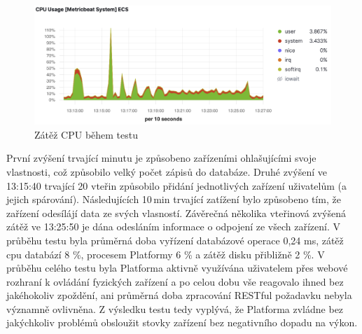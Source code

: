 \begin{figure}[htbp]
    \centering
    \includegraphics[width=\textwidth]{img/cpu_usage.png}
    \caption{\label{cpu-usage}Zátěž CPU během testu}
\end{figure}

První zvýšení trvající minutu je způsobeno zařízeními ohlašujícími svoje vlastnosti, což způsobilo velký počet zápisů do databáze. Druhé zvýšení ve 13:15:40 trvající 20 vteřin způsobilo přidání jednotlivých zařízení uživatelům (a jejich spárování). Následujících 10\,min trvající zatížení bylo způsobeno tím, že zařízení odesílájí data ze svých vlasností. Závěrečná několika vteřinová zvýšená zátěž ve 13:25:50 je dána odesláním informace o odpojení ze všech zařízení. V průběhu testu byla průměrná doba vyřízení databázové operace 0,24 ms, zátěž cpu databází 8 \%, procesem Platformy 6 \% a zátěž disku přibližně 2 \%. V průběhu celého testu byla Platforma aktivně využívána uživatelem přes webové rozhraní k ovládání fyzických zařízení a po celou dobu vše reagovalo ihned bez jakéhokoliv zpoždění, ani průměrná doba zpracování RESTful požadavku nebyla významně ovlivněna. Z výsledku testu tedy vyplývá, že Platforma zvládne bez jakýchkoliv problémů obsloužit stovky zařízení bez negativního dopadu na výkon.




